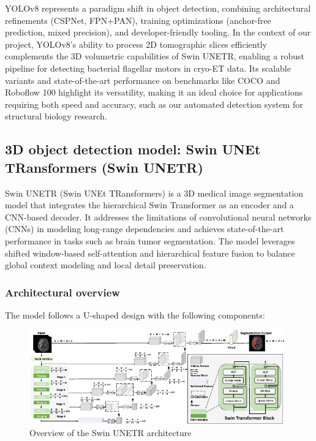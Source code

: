 \documentclass{article}
\begin{document}
YOLOv8 represents a paradigm shift in object detection, combining architectural refinements (CSPNet, FPN+PAN), training optimizations (anchor-free prediction, mixed precision), and developer-friendly tooling. In the context of our project, YOLOv8's ability to process 2D tomographic slices efficiently complements the 3D volumetric capabilities of Swin UNETR, enabling a robust pipeline for detecting bacterial flagellar motors in cryo-ET data. Its scalable variants and state-of-the-art performance on benchmarks like COCO and Roboflow 100 highlight its versatility, making it an ideal choice for applications requiring both speed and accuracy, such as our automated detection system for structural biology research.


\subsection{3D object detection model: Swin UNEt TRansformers (Swin UNETR)}
Swin UNETR (Swin UNEt TRansformers)\cite{Hatamizadeh2022SwinUS} is a 3D medical image segmentation model that integrates the hierarchical Swin Transformer as an encoder and a CNN-based decoder. It addresses the limitations of convolutional neural networks (CNNs) in modeling long-range dependencies and achieves state-of-the-art performance in tasks such as brain tumor segmentation. The model leverages shifted window-based self-attention and hierarchical feature fusion to balance global context modeling and local detail preservation.

\subsubsection{Architectural overview}
The model follows a U-shaped design with the following components:

\begin{figure}[htb]
    \centering
    \includegraphics[width=0.98\textwidth]{images/Overview of the Swin UNETR architecture.pdf}
    \caption{Overview of the Swin UNETR architecture}
    \label{fig:Overview_of_the_Swin_UNETR_architecture}
\end{figure}
\end{document}
